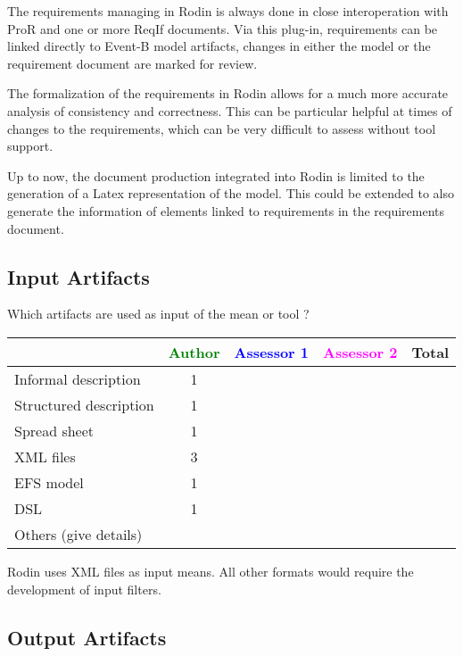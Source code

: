 \begin{author_comment}
  The requirements managing in Rodin is always done in close interoperation with
  ProR and one or more ReqIf documents. Via this plug-in, requirements can be
  linked directly to Event-B model artifacts, changes in either the model or the
  requirement document are marked for review.

  The formalization of the requirements in Rodin allows for a much more accurate
  analysis of consistency and correctness. This can be particular helpful at
  times of changes to the requirements, which can be very difficult to assess
  without tool support.

  Up to now, the document production integrated into Rodin is limited to the
  generation of a Latex representation of the model. This could be extended to
  also generate the information of elements linked to requirements in the
  requirements document.
\end{author_comment}


\subsection{Input Artifacts}

Which artifacts are used as input of the mean or tool  ? 


\begin{tabular}{|l | c | c | c | c|}
\hline
& \textcolor{green}{Author} & \textcolor{blue}{Assessor 1} & \textcolor{magenta}{Assessor 2} & Total \\
\hline 
Informal description & 1 & & &  \\
\hline
Structured description & 1 & & & \\
\hline
Spread sheet & 1 & & & \\
\hline
XML files & 3 & & & \\
\hline
EFS model & 1 & & & \\
\hline
DSL & 1 & & & \\
\hline
Others (give details) & & & & \\
\hline
\end{tabular}

\begin{author_comment}
  Rodin uses XML files as input means. All other formats would require the
  development of input filters.
\end{author_comment}

\subsection{Output Artifacts}


